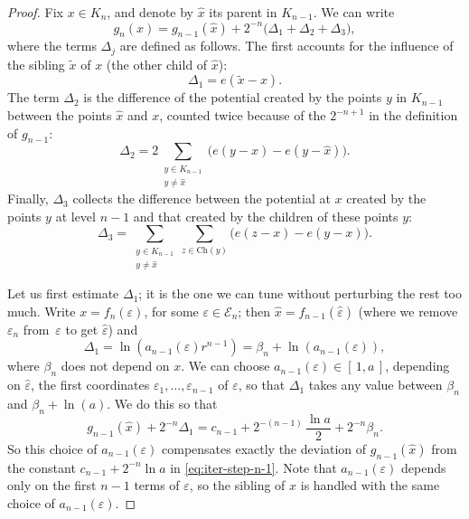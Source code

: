 \documentclass[JEP,XML,SOM,Unicode,published]{cedram}
\let\wt\widetilde
\let\wh\widehat
\numberwithin{equation}{section}
\theoremstyle{plain}
\theoremstyle{definition}
\newcommand{\cE}{{\mathcal E}}
\begin{document}
\begin{proof}
Fix $x\in K_n$, and denote by $\wh x$ its parent in $K_{n-1}$.
We can write
\begin{equation*}
g_n(x) = g_{n-1}(\wh x) + 2^{-n}\big (\Delta_1 + \Delta_2 + \Delta_3 \big),
\end{equation*}
where the terms $\Delta_j$ are defined as follows.
The first accounts for the influence of the sibling $\wt x$ of $x$ (the other child of $\wh x$):
\begin{equation}\label{eq:Delta1-def}
\Delta_1 = e(\wt x-x).
\end{equation}
The term $\Delta_2$ is the difference of the potential created by the points $y$ in $K_{n-1}$ between
the points $\wh x$ and $x$, counted twice because of the $2^{-n+1}$ in the definition of $g_{n-1}$:
\begin{equation}\label{eq:Delta2-def}
\Delta_2 = 2 \sum\limits_{\substack{ y \in K_{n-1}\\ y \neq \wh x}} \big (e( y-x) - e( y-\wh x)\big ).
\end{equation}
Finally, $\Delta_3$ collects the difference between the potential at $x$ created by the points $y$ at level $n-1$ and that created by the children of these points $y$:
\begin{equation}\label{eq:Delta3-def}
\Delta_3 = \sum\limits_{\substack{ y \in K_{n-1}\\ y \neq \wh x}} \sum_{z\in \mathrm{Ch}(y)} \big ( e(z-x) - e(y-x)\big ).
\end{equation}

Let us first estimate $\Delta_1$;
it is the one we can tune without perturbing the rest too much. Write $x= f_n(\varepsilon)$,
for some $\varepsilon \in \cE_n$; then $\wh x = f_{n-1}(\wh\varepsilon)$ (where we remove $\varepsilon_n$
from~$\varepsilon$ to get $\wh\varepsilon$) and
\begin{equation*}
\Delta_1 = \ln (a_{n-1}(\varepsilon)r^{n-1}) = \beta_n + \ln (a_{n-1}(\varepsilon)),
\end{equation*}
where $\beta_n$ does not depend on $x$. We can choose $a_{n-1}(\varepsilon) \in [\, 1,a\, ]$,
depending on $\wh \varepsilon$, \ie the first coordinates $\varepsilon_1, \ldots, \varepsilon_{n-1}$ of
$\varepsilon$, so that $\Delta_1$ takes any value between $\beta_n$ and $\beta_n + \ln(a)$.
We do this so that
\begin{equation*}
g_{n-1}(\wh x) + 2^{-n}\Delta_1 = c_{n-1} + 2^{-(n-1)}\,\dfrac{ \ln a}{2} + 2^{-n}\beta_n.
\end{equation*}
So this choice of $a_{n-1}(\varepsilon)$ compensates exactly the deviation of $g_{n-1}(\wh x)$ from the constant
$c_{n-1} +2^{-n} \ln a$ in \eqref{eq:iter-step-n-1}. Note that $a_{n-1}(\varepsilon)$ depends only on the
first $n-1$ terms of $\varepsilon$, so the sibling of $x$ is handled with the same choice of $a_{n-1}(\varepsilon)$.


\end{proof}
\end{document}
